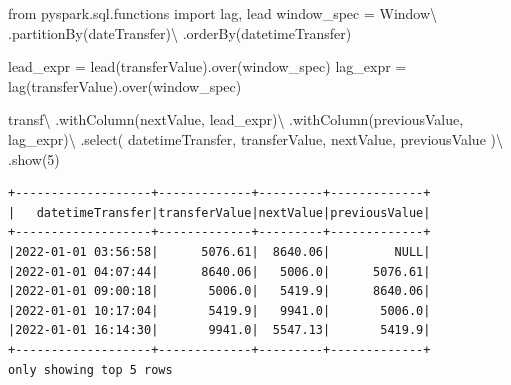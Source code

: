\documentclass[
  11pt,
  letterpaper,
  DIV=11,
  numbers=noendperiod]{scrreprt}
\newenvironment{Shaded}{\begin{snugshade}}{\end{snugshade}}
\newcommand{\DecValTok}[1]{\textcolor[rgb]{0.68,0.00,0.00}{#1}}
\newcommand{\ImportTok}[1]{\textcolor[rgb]{0.00,0.46,0.62}{#1}}
\newcommand{\NormalTok}[1]{\textcolor[rgb]{0.00,0.23,0.31}{#1}}
\newcommand{\OperatorTok}[1]{\textcolor[rgb]{0.37,0.37,0.37}{#1}}
\newcommand{\StringTok}[1]{\textcolor[rgb]{0.13,0.47,0.30}{#1}}
\begin{document}
\begin{Shaded}
\begin{Highlighting}[]
\ImportTok{from}\NormalTok{ pyspark.sql.functions }\ImportTok{import}\NormalTok{ lag, lead}
\NormalTok{window\_spec }\OperatorTok{=}\NormalTok{ Window}\OperatorTok{\textbackslash{}}
\NormalTok{    .partitionBy(}\StringTok{\textquotesingle{}dateTransfer\textquotesingle{}}\NormalTok{)}\OperatorTok{\textbackslash{}}
\NormalTok{    .orderBy(}\StringTok{\textquotesingle{}datetimeTransfer\textquotesingle{}}\NormalTok{)}

\NormalTok{lead\_expr }\OperatorTok{=}\NormalTok{ lead(}\StringTok{\textquotesingle{}transferValue\textquotesingle{}}\NormalTok{).over(window\_spec)}
\NormalTok{lag\_expr }\OperatorTok{=}\NormalTok{ lag(}\StringTok{\textquotesingle{}transferValue\textquotesingle{}}\NormalTok{).over(window\_spec)}

\NormalTok{transf}\OperatorTok{\textbackslash{}}
\NormalTok{    .withColumn(}\StringTok{\textquotesingle{}nextValue\textquotesingle{}}\NormalTok{, lead\_expr)}\OperatorTok{\textbackslash{}}
\NormalTok{    .withColumn(}\StringTok{\textquotesingle{}previousValue\textquotesingle{}}\NormalTok{, lag\_expr)}\OperatorTok{\textbackslash{}}
\NormalTok{    .select(}
        \StringTok{\textquotesingle{}datetimeTransfer\textquotesingle{}}\NormalTok{,}
        \StringTok{\textquotesingle{}transferValue\textquotesingle{}}\NormalTok{,}
        \StringTok{\textquotesingle{}nextValue\textquotesingle{}}\NormalTok{,}
        \StringTok{\textquotesingle{}previousValue\textquotesingle{}}
\NormalTok{    )}\OperatorTok{\textbackslash{}}
\NormalTok{    .show(}\DecValTok{5}\NormalTok{)}
\end{Highlighting}
\end{Shaded}

\begin{verbatim}
+-------------------+-------------+---------+-------------+
|   datetimeTransfer|transferValue|nextValue|previousValue|
+-------------------+-------------+---------+-------------+
|2022-01-01 03:56:58|      5076.61|  8640.06|         NULL|
|2022-01-01 04:07:44|      8640.06|   5006.0|      5076.61|
|2022-01-01 09:00:18|       5006.0|   5419.9|      8640.06|
|2022-01-01 10:17:04|       5419.9|   9941.0|       5006.0|
|2022-01-01 16:14:30|       9941.0|  5547.13|       5419.9|
+-------------------+-------------+---------+-------------+
only showing top 5 rows
\end{verbatim}

\end{document}
